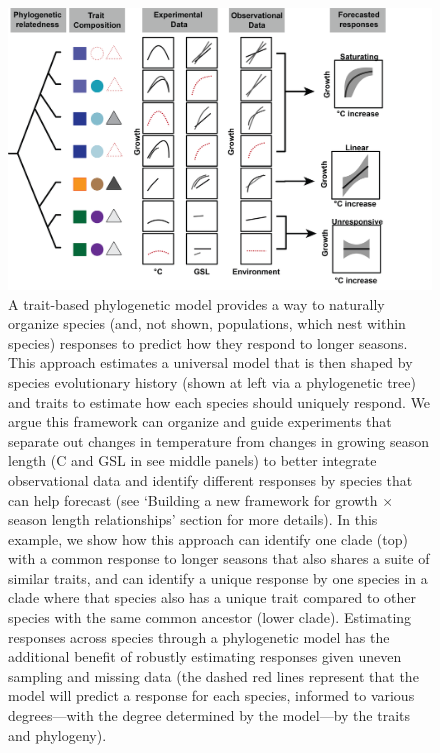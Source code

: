 \documentclass[11pt]{article}
\begin{document}
\clearpage
\begin{figure}[h!]
\includegraphics[width=1\textwidth]{..//figures/phylomodel/phylomodel.png}
\caption{A trait-based phylogenetic model provides a way to naturally organize species (and, not shown, populations, which nest within species) responses to predict how they respond to longer seasons. This approach estimates a universal model that is then shaped by species evolutionary history (shown at left via a phylogenetic tree) and traits to estimate how each species should uniquely respond. We argue this framework can organize and guide experiments that separate out changes in temperature from changes in growing season length (\degree C and GSL in see middle panels) to better integrate observational data and identify different responses by species that can help forecast (see `Building a new framework for growth $\times$ season length relationships' section for more details). In this example, we show how this approach can identify one clade (top) with a common response to longer seasons that also shares a suite of similar traits, and can identify a unique response by one species in a clade where that species also has a unique trait compared to other species with the same common ancestor (lower clade). Estimating responses across species through a phylogenetic model has the additional benefit of robustly estimating responses given uneven sampling and missing data (the dashed red lines represent that the model will predict a response for each species, informed to various degrees---with the degree determined by the model---by the traits and phylogeny). }  %
\label{fig:phylomodel}
\end{figure}
\end{document}
